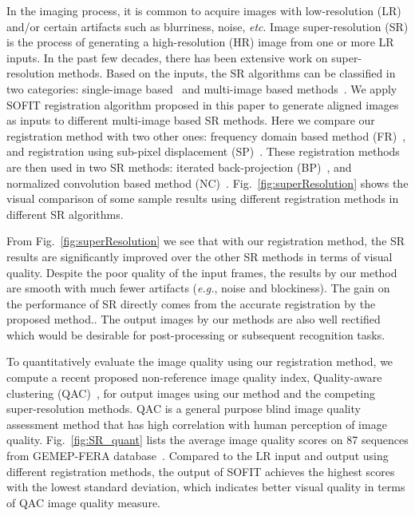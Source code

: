 \documentclass[10pt,journal]{IEEEtran}
\begin{document}
In the imaging process, it is common to acquire images with low-resolution (LR) and/or certain artifacts such as blurriness, noise, \textit{etc}. Image super-resolution (SR) is the process of generating a high-resolution (HR) image from one or more LR inputs. In the past few decades, there has been extensive work on super-resolution methods. Based on the inputs, the SR algorithms can be classified in two categories: single-image based~\cite{Sun_CVPR08} and multi-image based methods~\cite{Irani91}. We apply SOFIT registration algorithm proposed in this paper to generate aligned images as inputs to different multi-image based SR methods. Here we compare our registration method with two other ones: frequency domain based method (FR)~\cite{Vandewalle06}, and registration using sub-pixel displacement (SP)~\cite{Keren_CVPR88}. These registration methods are then used in two SR methods: iterated back-projection (BP)~\cite{Irani91}, and normalized convolution based method (NC)~\cite{Pham_06}. Fig.~\ref{fig:superResolution} shows the visual comparison of some sample results using different registration methods in different SR algorithms.

From Fig.~\ref{fig:superResolution} we see that with our registration method, the SR results are significantly improved over the other SR methods in terms of visual quality. Despite the poor quality of the input frames, the results by our method are smooth with much fewer artifacts (\textit{e.g.}, noise and blockiness). The gain on the performance of SR directly comes from the accurate registration by the proposed method.. The output images by our methods are also well rectified which would be desirable for post-processing or subsequent recognition tasks. 

To quantitatively evaluate the image quality using our registration method, we compute a recent proposed non-reference image quality index, Quality-aware clustering (QAC)~\cite{Xue_CVPR13}, for output images using our method and the competing super-resolution methods. QAC is a general purpose blind image quality assessment method that has high correlation with human perception of image quality. Fig.~\ref{fig:SR_quant} lists the average image quality scores on 87 sequences from GEMEP-FERA database~\cite{FERA11}. Compared to the LR input and output using different registration methods, the output of SOFIT achieves the highest scores with the lowest standard deviation, which indicates better visual quality in terms of QAC image quality measure.
\end{document}
